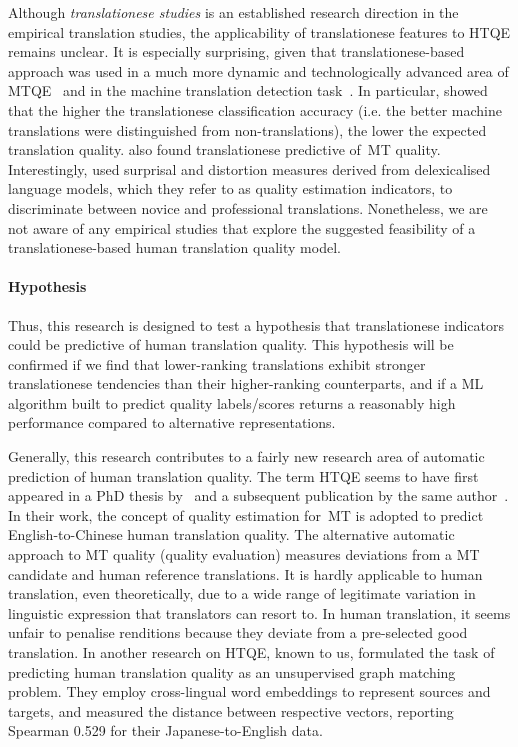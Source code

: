 Although \textit{translationese studies} is an established research direction in the empirical translation studies, the applicability of translationese features to \gls{HTQE} remains unclear. It is especially surprising, given that translationese-based approach was used in a much more dynamic and technologically advanced area of \gls{MTQE}~\cite{Aharoni2015} and in the machine translation detection task~\cite{Carter2012}. In particular, \citet{Aharoni2015} showed that the higher the translationese classification accuracy (i.e. the better machine translations were distinguished from non-translations), the lower the expected translation quality. \citet{Aranberri2020} also found translationese predictive of~\gls{MT} quality. Interestingly, \citet{Rubino2016} used surprisal and distortion measures derived from delexicalised language models, which they refer to as quality estimation indicators, to discriminate between novice and professional translations.
Nonetheless, we are not aware of any empirical studies that explore the suggested feasibility of a translationese-based human translation quality model. %

\paragraph{Hypothesis} Thus, this research is designed to test a hypothesis that translationese indicators could be predictive of human translation quality. This hypothesis will be confirmed if we find that lower-ranking translations exhibit stronger translationese tendencies than their higher-ranking counterparts, and if a ML algorithm built to predict quality labels/scores returns a reasonably high performance compared to alternative representations.  

Generally, this research contributes to a fairly new research area of automatic prediction of human translation quality. The term \gls{HTQE} seems to have first appeared in a PhD thesis by~\citet{Yuan2018} and a subsequent publication by the same author~\cite{Yuan2020}. In their work, the concept of quality estimation for~\gls*{MT} is adopted to predict English-to-Chinese human translation quality. 
The alternative automatic approach to MT quality (quality evaluation) measures deviations from a MT candidate and human reference translations. It is hardly applicable to human translation, even theoretically, due to a wide range of legitimate variation in linguistic expression that translators can resort to. In human translation, it seems unfair to penalise renditions because they deviate from a pre-selected good translation.
In another research on HTQE, known to us, \citet{Zhou2019} formulated the task of predicting human translation quality as an unsupervised graph matching problem. They employ cross-lingual word embeddings to represent sources and targets, and measured the distance between respective vectors, reporting Spearman 0.529 for their Japanese-to-English data. 

